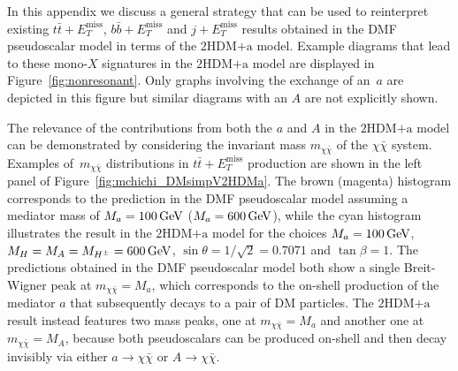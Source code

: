 \documentclass[a4paper, 11pt,notoc]{article}
\newcommand{\MET}{\ensuremath{E_T^\mathrm{miss}}\xspace}
\newcommand{\mA}{\ensuremath{M_{A}}\xspace}
\newcommand{\ma}{\ensuremath{M_{a}}\xspace}
\newcommand{\mH}{\ensuremath{M_{H}}\xspace}
\newcommand{\mHc}{\ensuremath{M_{H^{\pm}}}\xspace}
\newcommand{\hdma}{\ensuremath{\textrm{2HDM+a}}\xspace}
\begin{document}
In this appendix we discuss  a general strategy that can be used to reinterpret existing $t \bar t + \MET$, $b \bar b + \MET$ and $j + \MET$ results obtained in the DMF pseudoscalar model in terms of the \hdma model. Example diagrams that lead to these mono-$X$ signatures in the \hdma model are displayed in Figure~\ref{fig:nonresonant}. Only graphs involving the exchange of an~$a$ are depicted in this figure but similar diagrams  with an  $A$ are not explicitly shown. 

 The relevance of the contributions from both the $a$ and $A$ in the \hdma model can be  demonstrated by considering the invariant mass $m_{\chi \bar \chi}$ of the $\chi \bar \chi$ system. Examples of~$m_{\chi \bar \chi}$ distributions in $t \bar t + \MET$ production are shown in the left panel of Figure~\ref{fig:mchichi_DMsimpV2HDMa}. The brown (magenta) histogram corresponds to the prediction in the DMF pseudoscalar model assuming a mediator mass of $\ma =100 \, {\rm  GeV}$ ($\ma =600 \, {\rm  GeV}$), while the cyan histogram illustrates the result in the \hdma model for the choices $\ma = 100 \, {\rm  GeV}$, $\mH = \mA = \mHc = 600 \, {\rm  GeV}$, $\sin\theta=1/\sqrt{2}=0.7071$ and $\tan\beta=1$. The predictions obtained in the  DMF pseudoscalar model both show a single  Breit-Wigner  peak  at $m_{\chi \bar \chi} = \ma$, which corresponds to the on-shell production of the mediator $a$ that subsequently decays to a pair of DM particles. The \hdma result instead features two mass peaks, one at $m_{\chi \bar \chi} = \ma$ and another one at $m_{\chi \bar \chi} = \mA$, because both pseudoscalars can be produced on-shell and then decay invisibly via either $a \to \chi \bar \chi$ or $A \to \chi \bar \chi$.  
\end{document}
